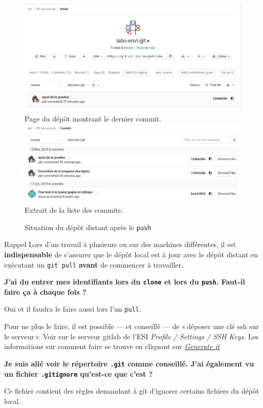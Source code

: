 \documentclass[a4paper,11pt]{style-esi/td}
\begin{document}
\begin{figure}[h]
	\centering
	\includegraphics[width=\linewidth]{img/depot-distant-apres-1.png}
	Page du dépôt montrant le dernier commit.
	\includegraphics[width=\linewidth]{img/depot-distant-apres-2.png}
	Extrait de la liste des commits.
	\caption{Situation du dépôt distant après le \texttt{push}}
	\label{fig:git-push}
\end{figure}

\begin{alertit}{Rappel}
Lors d'un travail à plusieurs ou sur des machines différentes, il est
\textbf{indispensable} de s'assurer que le dépôt local est à jour avec le dépôt
distant en exécutant un \texttt{git pull} \textbf{avant} de commencer à travailler. 
\end{alertit}


\begin{faq}

	\textbf{J'ai du entrer mes identifiants lors du \texttt{clone} et lors du
	\texttt{push}. Faut-il faire ça à chaque fois ? }
	\medskip

	Oui et il faudra le faire aussi lors l'un \texttt{pull}. 

	Pour ne plus le faire, il est possible — et conseillé — de « déposer une
	clé ssh sur le serveur ». Voir sur le serveur gitlab de l'ESI
	\textit{Profile / Settings / SSH Keys}. Les informations sur comment faire se
	trouve en cliquant sur \href{https://git.esi-bru.be/help/ssh/README}
	{\textit{Generate it}}

	\bigskip
	\textbf{Je suis allé voir le répertoire \texttt{.git} comme conseillé. J'ai également 
	vu un fichier \texttt{.gitignore} qu'est-ce que c'est ?}
	\medskip

	Ce fichier contient des règles demandant à git d'ignorer certains fichiers du
	dépôt local. 


\end{faq}
\end{document}

